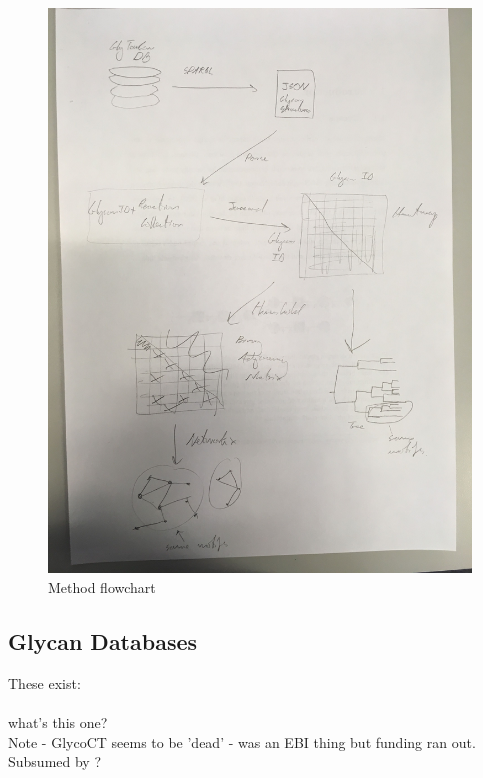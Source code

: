 \documentclass[12pt,a4paper]{article}
\begin{document}
\begin{figure}[H]
\centering 
\includegraphics[scale=0.12]{images/flowchart.JPG} 
\caption{Method flowchart}
\label{fig:flowchart}
\end{figure}

\subsection{Glycan Databases}
\label{sec:glycan_databases}
These exist:\\

 \\

what's this one?  \\

Note - GlycoCT seems to be 'dead' - was an EBI thing but funding ran out. Subsumed by  ? \\
\end{document}
